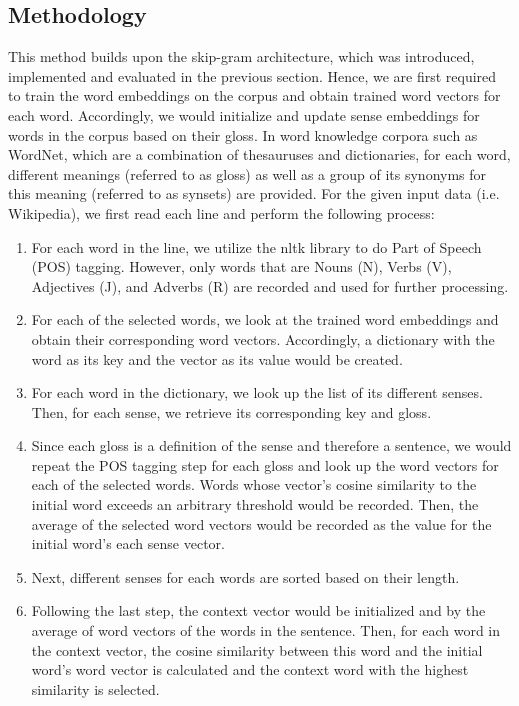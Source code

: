 \documentclass[12pt,a4paper]{article}
\begin{document}
	\subsection{Methodology}
	This method builds upon the skip-gram architecture, which was introduced, implemented and evaluated in the previous section. Hence, we are first required to train the word embeddings on the corpus and obtain trained word vectors for each word. Accordingly, we would initialize and update sense embeddings for words in the corpus based on their gloss. In word knowledge corpora such as WordNet, which are a combination of thesauruses and dictionaries, for each word, different meanings (referred to as gloss) as well as a group of its synonyms for this meaning (referred to as synsets) are provided. For the given input data (i.e. Wikipedia), we first read each line and perform the following process:
	\begin{enumerate}
		\item For each word in the line, we utilize the nltk library to do Part of Speech (POS) tagging. However, only words that are Nouns (N), Verbs (V), Adjectives (J), and Adverbs (R) are recorded and used for further processing.
		\item For each of the selected words, we look at the trained word embeddings and obtain their corresponding word vectors. Accordingly, a dictionary with the word as its key and the vector as its value would be created.
		\item For each word in the dictionary, we look up the list of its different senses. Then, for each sense, we retrieve its corresponding key and gloss. 
		\item Since each gloss is a definition of the sense and therefore a sentence, we would repeat the POS tagging step for each gloss and look up the word vectors for each of the selected words. Words whose vector's cosine similarity to the initial word exceeds an arbitrary threshold would be recorded. Then, the average of the selected word vectors would be recorded as the value for the initial word's each sense vector.
		\item Next, different senses for each words are sorted based on their length.
		\item Following the last step, the context vector would be initialized and by the average of word vectors of the words in the sentence. Then, for each word in the context vector, the cosine similarity between this word and the initial word's word vector is calculated and the context word with the highest similarity is selected.
	\end{enumerate}
\end{document}
